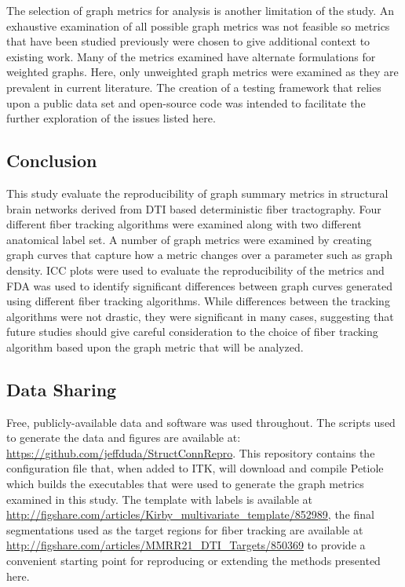 \documentclass{frontiersSCNS} %
\begin{document}
The selection of graph metrics for analysis is another limitation of the study. An exhaustive examination of all
possible graph metrics was not feasible so metrics that have been studied previously were chosen to give additional
context to existing work. Many of the metrics examined have alternate formulations for 
weighted graphs. Here, only unweighted graph metrics were examined as they are prevalent in current literature.
 The creation of a testing framework that relies upon a public data set and open-source code
was intended to facilitate the further exploration of the issues listed here.

\subsection{Conclusion}
This study evaluate the reproducibility of graph summary metrics in structural brain networks derived from
DTI based deterministic fiber tractography. Four different fiber tracking algorithms were examined along
with two different anatomical label set. A number of graph metrics were examined by creating graph curves that capture how a metric
changes over a parameter such as graph density. ICC plots were used to evaluate the reproducibility of the metrics and FDA
was used to identify significant differences between graph curves generated using different fiber tracking algorithms.
While differences between the tracking algorithms were not drastic, they were significant in many cases, suggesting
that future studies should give careful consideration to the choice of fiber tracking algorithm based upon the graph
metric that will be analyzed. 


\subsection{Data Sharing}
Free, publicly-available data and software was used throughout. The scripts used to generate the data and figures are available at: \url{https://github.com/jeffduda/StructConnRepro}. This repository contains the configuration file that, when added to ITK, will download and compile Petiole which builds the executables that were used to generate the graph metrics examined in this study. The template with labels is available at \url{http://figshare.com/articles/Kirby_multivariate_template/852989}, the final segmentations used as the target regions for fiber tracking are available at \url{http://figshare.com/articles/MMRR21_DTI_Targets/850369} to provide a convenient starting point for reproducing or extending the methods presented here. 
\end{document}
